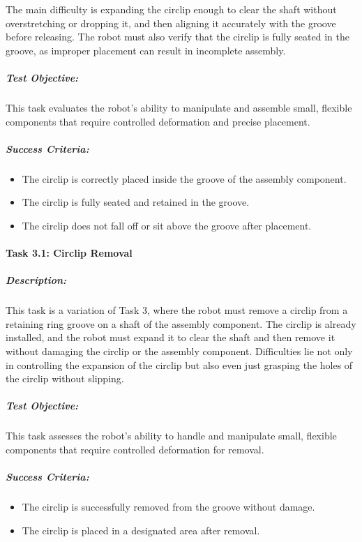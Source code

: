 \documentclass[letterpaper,10pt,english]{sphinxmanual}
\begin{document}
\sphinxAtStartPar
The main difficulty is expanding the circlip enough to clear the shaft without overstretching or dropping it, and then aligning it accurately with the groove before releasing.
The robot must also verify that the circlip is fully seated in the groove, as improper placement can result in incomplete assembly.


\subparagraph{Test Objective:}
\label{\detokenize{robotic_instructions_elastic_deformation:id5}}
\sphinxAtStartPar
This task evaluates the robot’s ability to manipulate and assemble small, flexible components that require controlled deformation and precise placement.


\subparagraph{Success Criteria:}
\label{\detokenize{robotic_instructions_elastic_deformation:id6}}\begin{itemize}
\item {} 
\sphinxAtStartPar
The circlip is correctly placed inside the groove of the assembly component.

\item {} 
\sphinxAtStartPar
The circlip is fully seated and retained in the groove.

\item {} 
\sphinxAtStartPar
The circlip does not fall off or sit above the groove after placement.

\end{itemize}


\paragraph{Task 3.1: Circlip Removal}
\label{\detokenize{robotic_instructions_elastic_deformation:task-3-1-circlip-removal}}

\subparagraph{Description:}
\label{\detokenize{robotic_instructions_elastic_deformation:id7}}
\sphinxAtStartPar
This task is a variation of Task 3, where the robot must remove a circlip from a retaining ring groove on a shaft of the assembly component.
The circlip is already installed, and the robot must expand it to clear the shaft and then remove it without damaging the circlip or the assembly component.
Difficulties lie not only in controlling the expansion of the circlip but also even just grasping the holes of the circlip without slipping.


\subparagraph{Test Objective:}
\label{\detokenize{robotic_instructions_elastic_deformation:id8}}
\sphinxAtStartPar
This task assesses the robot’s ability to handle and manipulate small, flexible components that require controlled deformation for removal.


\subparagraph{Success Criteria:}
\label{\detokenize{robotic_instructions_elastic_deformation:id9}}\begin{itemize}
\item {} 
\sphinxAtStartPar
The circlip is successfully removed from the groove without damage.

\item {} 
\sphinxAtStartPar
The circlip is placed in a designated area after removal.

\end{itemize}



\renewcommand{\indexname}{Index}
\printindex
\end{document}
